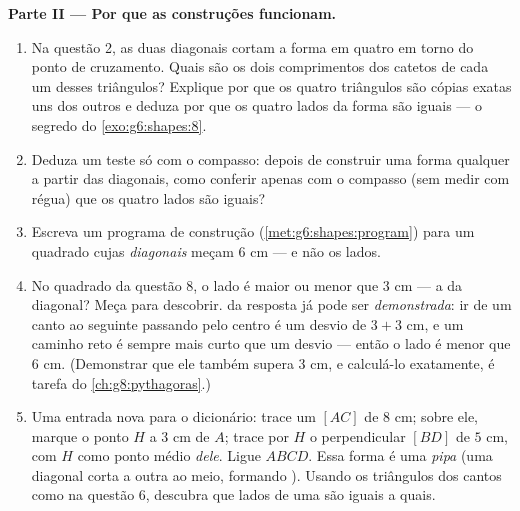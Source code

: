 \begin{problem}
\medskip
\noindent\textbf{Parte II --- Por que as construções funcionam.}
\begin{enumerate}[resume]
  \item Na questão 2, as duas diagonais cortam a forma em quatro
         em torno do ponto de cruzamento. Quais
        são os dois comprimentos dos catetos de cada um desses
        triângulos? Explique por que os quatro triângulos são cópias
        exatas uns dos outros e deduza por que os quatro lados da forma
        são iguais --- o segredo do \cref{exo:g6:shapes:8}.
  \item Deduza um teste só com o compasso: depois de construir uma
        forma qualquer a partir das diagonais, como conferir apenas com
        o compasso (sem medir com régua) que os quatro lados são
        iguais?
  \item Escreva um programa de construção
        (\cref{met:g6:shapes:program}) para um quadrado cujas
        \emph{diagonais} meçam $6$ cm --- e não os lados.
  \item No quadrado da questão 8, o lado é maior ou menor que $3$ cm
        --- a  da diagonal? Meça para descobrir.  da
        resposta já pode ser \emph{demonstrada}: ir de um canto ao
        seguinte passando pelo centro é um desvio de $3 + 3$ cm, e um
        caminho reto é sempre mais curto que um desvio --- então o lado
        é menor que $6$ cm. (Demonstrar que ele também supera $3$ cm, e
        calculá-lo exatamente, é tarefa do
        \cref{ch:g8:pythagoras}.)
  \item Uma entrada nova para o dicionário: trace um  $[AC]$ de
        $8$ cm; sobre ele, marque o ponto $H$ a $3$ cm de $A$; trace por
        $H$ o  perpendicular $[BD]$ de $5$ cm, com $H$ como
        ponto médio \emph{dele}. Ligue $ABCD$. Essa forma é uma
        \emph{pipa} (uma diagonal corta a outra ao meio,
        formando ). Usando os triângulos dos cantos como na
        questão 6, descubra que lados de uma  são iguais a quais.
\end{enumerate}


\end{problem}
